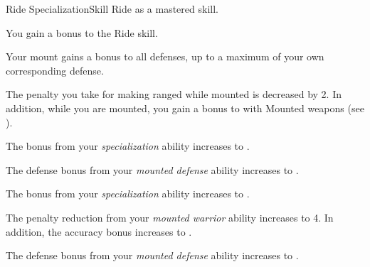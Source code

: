     \begin{feat}{Ride Specialization}{Skill}
        \featpre Ride as a mastered skill.

         You gain a  bonus to the Ride skill.

         Your mount gains a  bonus to all defenses, up to a maximum of your own corresponding defense.

         The penalty you take for making ranged  while mounted is decreased by 2.
        In addition, while you are mounted, you gain a  bonus to  with Mounted weapons (see ).

         The bonus from your \textit{specialization} ability increases to .

         The defense bonus from your \textit{mounted defense} ability increases to .

         The bonus from your \textit{specialization} ability increases to .

         The penalty reduction from your \textit{mounted warrior} ability increases to 4.
        In addition, the accuracy bonus increases to .

         The defense bonus from your \textit{mounted defense} ability increases to .
    \end{feat}

